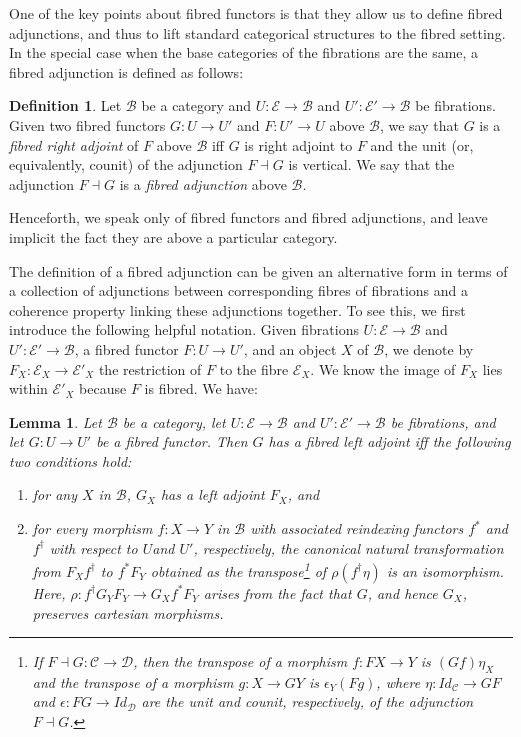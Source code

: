 \documentclass{LMCS}
\newcommand{\ra}{\rightarrow}
\newcommand{\mcal}[1]{\mathcal{#1}}
\newcommand{\C}{\mcal{C}}
\newcommand\E{{\mathcal E}}
\newcommand\B{{\mathcal B}}
\newcommand\D{{\mathcal D}}
\theoremstyle{plain}
\newtheorem{lemma}[theorem]{Lemma}
\theoremstyle{remark}
\theoremstyle{definition}
\newtheorem{definition}[theorem]{Definition}
\begin{document}
One of the key points about fibred functors is that they allow us to
define fibred adjunctions, and thus to lift standard categorical
structures to the fibred setting. In the special case when the base
categories of the fibrations are the same, a fibred adjunction is
defined as follows:

\begin{definition}
  Let $\B$ be a category and $U:\E \ra \B$ and $U':\E' \ra \B$ be
  fibrations. Given two fibred functors $G:U\to U'$ and $F:U'\to U$
  above $\B$, we say that $G$ is a {\em fibred right adjoint} of $F$
  above $\B$ iff $G$ is right adjoint to $F$ and the unit (or,
  equivalently, counit) of the adjunction $F\dashv G$ is vertical.  We
  say that the adjunction $F \dashv G$ is a {\em fibred adjunction}
  above $\B$.
\end{definition}
\noindent
Henceforth, we speak only of fibred functors and fibred adjunctions,
and leave implicit the fact they are above a particular category. 

The definition of a fibred adjunction can be given an alternative form
in terms of a collection of adjunctions between corresponding fibres
of fibrations and a coherence property linking these adjunctions
together. To see this, we first introduce the following helpful
notation.  Given fibrations $U:\E \ra \B$ and $U':\E' \ra \B$, a
fibred functor $F:U \ra U'$, and an object $X$ of $\B$, we denote by
$F_X:\E_X \ra \E'_X$ the restriction of $F$ to the fibre $\E_X$. We
know the image of $F_X$ lies within $\E'_X$ because $F$ is fibred. We
have:

\begin{lemma}\label{lem:fibadj}
  Let $\B$ be a category, let $U:\E\to\B$ and $U':\E'\to\B$ be
  fibrations, and let $G:U \ra U'$ be a fibred functor. Then $G$ has a
  fibred left adjoint iff the following two conditions hold:
\begin{enumerate}[\em(1)]
\item for any $X$ in $\B$, $G_X$ has a left adjoint $F_X$, and
\item for every morphism $f:X\to Y$ in $\B$ with associated reindexing
  functors $f^*$ and $f^{\dagger}$ with respect to $U$and $U'$,
  respectively, the canonical natural transformation from
  $F_Xf^{\dagger}$ to $f^* F_Y$ obtained as the transpose\footnote{If
    $F \dashv G: \C \rightarrow \D$, then the transpose of a morphism
    $f : FX \rightarrow Y$ is $(Gf)\eta_X$ and the transpose of a
    morphism $g : X \ra GY$ is $\epsilon_Y (Fg)$, where $\eta :
    \mathit{Id}_\C \ra GF$ and $\epsilon : FG \ra \mathit{Id}_\D$ are
    the unit and counit, respectively, of the adjunction $F \dashv
    G$.} of $\rho (f^{\dagger}\eta)$ is an isomorphism. Here, $\rho :
  f^{\dagger}G_YF_Y \rightarrow G_Xf^*F_Y$ arises from the fact that
  $G$, and hence $G_X$, preserves cartesian morphisms.
\end{enumerate}
\end{lemma}
\end{document}
